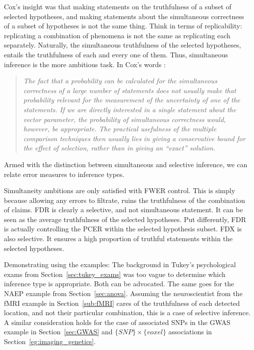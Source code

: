 \documentclass[review,12pt]{article}
\theoremstyle{definition}
\theoremstyle{definition}
\begin{document}
Cox's insight was that making statements on the truthfulness of a subset of selected hypotheses, and making statements about the simultaneous correctness of a subset of hypotheses is not the same thing. 
Think in terms of replicability: replicating a combination of phenomena is not the same as replicating each separately.
Naturally, the simultaneous truthfulness of the selected hypotheses, entails the truthfulness of each and every one of them. Thus, simultaneous inference is the more ambitious task.
In  Cox's words \cite{cox_remark_1965}:
\begin{quote}\em
The fact that a probability can be calculated for the simultaneous correctness of a large number of statements does not usually make that probability relevant for the measurement of
the uncertainty of one of the statements. If we are directly interested in a single statement about the vector parameter, the probability of simultaneous correctness would, however, be appropriate. The practical usefulness of the multiple comparison techniques then usually lies in giving a conservative bound for the effect of selection, rather than in giving an ``exact'' solution.
\end{quote}

Armed with the distinction between simultaneous and selective inference, we can relate error measures to inference types. 

Simultaneity ambitions are only satisfied with FWER control. This is simply because allowing any errors to filtrate, ruins the truthfulness of the combination of claims.
FDR is clearly a selective, and not simultaneous statement. It can be seen as the average truthfulness of the selected hypotheses. Put differently, FDR is actually controlling the PCER  within the selected hypothesis subset.
FDX is also selective. It ensures a high proportion of truthful statements within the selected hypotheses. 

Demonstrating using the examples: 
The background in Tukey's psychological exams from Section~\ref{sec:tukey_exams} was too vague to determine which inference type is appropriate. Both can be advocated. 
The same goes for the NAEP example from Section~\ref{sec:anova}. 
Assuming the neuroscientist from the fMRI example in Section~\ref{sub:fMRI} cares of the truthfulness of each detected location, and not their particular combination, this is a case of selective inference. A similar consideration holds for the case of associated SNPs in the GWAS example in Section~\ref{sec:GWAS} and $\{SNP\} \times \{voxel\}$ associations in Section~\ref{eg:imaging_genetics}.
\end{document}
